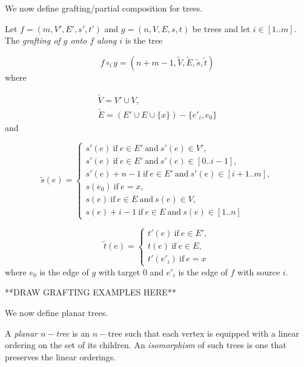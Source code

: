 We now define grafting/partial composition for trees.
\begin{defn}
	Let $f= (m, V', E', s', t')$ and $g= (n, V, E, s, t)$ be trees and let 
	$i \in [1..m]$. The \emph{grafting of $g$ onto $f$ along $i$} is the tree

	\begin{equation*}
		f \circ_i g= (n+m-1, \tilde{V}, \tilde{E}, \tilde{s}, \tilde{t})
	\end{equation*} where

	\setcounter{equation}{0}
	\begin{eqnarray}
		\tilde{V}= V' \cup V,\\
		\tilde{E}= (E' \cup E \cup \{x\}) - \{e'_i, e_0\}
	\end{eqnarray} and

	\begin{displaymath}
		\tilde{s}(e)=
		\begin{cases}
			s'(e)\ \text{if}\ e \in E'\ \text{and}\ s'(e) \in V',\\
			s'(e)\ \text{if}\ e \in E'\ \text{and}\ s'(e) \in [0..i-1],\\
			s'(e) + n-1\ \text{if}\ e \in E'\ \text{and}\ s'(e) \in [i+1..m],\\
			s(e_0)\ \text{if}\ e = x,\\
			s(e)\ \text{if}\ e \in E\ \text{and}\ s(e) \in V,\\
			s(e) + i-1\ \text{if}\ e \in E\ \text{and}\ s(e) \in [1..n]
		\end{cases}
	\end{displaymath}

	\begin{displaymath}
		\tilde{t}(e)=
		\begin{cases}
			t'(e)\ \text{if}\ e \in E',\\
			t(e)\ \text{if}\ e \in E,\\
			t'(e'_i)\ \text{if}\ e = x
		\end{cases}
	\end{displaymath} where $e_0$ is the edge of $g$ with target $0$ and $e'_i$ is the
	edge of $f$ with source $i$.
\end{defn}

**DRAW GRAFTING EXAMPLES HERE**

\bigskip

We now define planar trees.
\begin{defn}\label{plts}
	A \emph{planar $n-$tree} is an $n-$tree such that each vertex is equipped
	with a linear ordering on the set of its children. An \emph{isomorphism}
	of such trees is one that preserves the linear orderings.
\end{defn}

